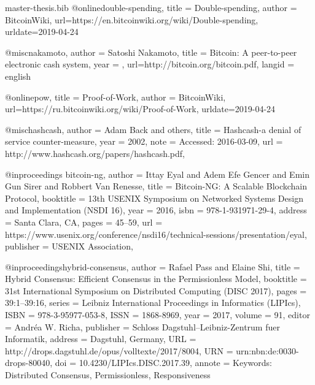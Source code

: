 \begin{filecontents}{master-thesis.bib}
@online{double-spending,
  title = {Double-spending},
  author = {BitcoinWiki},
  url={https://en.bitcoinwiki.org/wiki/Double-spending},
  urldate={2019-04-24}
}

@misc{nakamoto,
    author = {Satoshi Nakamoto},
    title = {Bitcoin: A peer-to-peer electronic cash system},
    year = {},
    url={http://bitcoin.org/bitcoin.pdf},
    langid = {english}
}

@online{pow,
  title = {Proof-of-Work},
  author = {BitcoinWiki},
  url={https://ru.bitcoinwiki.org/wiki/Proof-of-Work},
  urldate={2019-04-24}
}

@misc{hashcash,
  author = {Adam Back and others},
  title = {Hashcash-a denial of service counter-measure},
  year = {2002},
  note = {Accessed: 2016-03-09},
  url = {http://www.hashcash.org/papers/hashcash.pdf},
}

@inproceedings {bitcoin-ng,
author = {Ittay Eyal and Adem Efe Gencer and Emin Gun Sirer and Robbert Van Renesse},
title = {Bitcoin-NG: A Scalable Blockchain Protocol},
booktitle = {13th {USENIX} Symposium on Networked Systems Design and Implementation ({NSDI} 16)},
year = {2016},
isbn = {978-1-931971-29-4},
address = {Santa Clara, CA},
pages = {45--59},
url = {https://www.usenix.org/conference/nsdi16/technical-sessions/presentation/eyal},
publisher = {{USENIX} Association},
}

@inproceedings{hybrid-consensus,
  author =	{Rafael Pass and Elaine Shi},
  title =	{{Hybrid Consensus: Efficient Consensus in the Permissionless Model}},
  booktitle =	{31st International Symposium on Distributed Computing (DISC 2017)},
  pages =	{39:1--39:16},
  series =	{Leibniz International Proceedings in Informatics (LIPIcs)},
  ISBN =	{978-3-95977-053-8},
  ISSN =	{1868-8969},
  year =	{2017},
  volume =	{91},
  editor =	{Andr{\'e}a W. Richa},
  publisher =	{Schloss Dagstuhl--Leibniz-Zentrum fuer Informatik},
  address =	{Dagstuhl, Germany},
  URL =		{http://drops.dagstuhl.de/opus/volltexte/2017/8004},
  URN =		{urn:nbn:de:0030-drops-80040},
  doi =		{10.4230/LIPIcs.DISC.2017.39},
  annote =	{Keywords: Distributed Consensus, Permissionless, Responsiveness}
}
\end{filecontents}